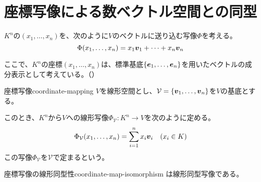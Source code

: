 \documentclass[../../../topic_linear-algebra]{subfiles}
\begin{document}
\sectionline
\section{座標写像による数ベクトル空間との同型}

$K^n$の$(x_1,\dots,x_n)$を、次のように$V$のベクトルに送り込む写像$\Phi$を考える。
\begin{equation*}
  \Phi(x_1,\dots,x_n) = x_1 \vb*{v}_1 + \cdots + x_n \vb*{v}_n
\end{equation*}

ここで、$K^n$の座標$(x_1,\dots,x_n)$は、標準基底$\{ \vb*{e}_1, \dots, \vb*{e}_n \}$を用いたベクトルの成分表示として考えている。（）

\begin{mindflow}
\end{mindflow}

\begin{definition}{座標写像}{coordinate-mapping}
  $V$を線形空間とし、$\mathcal{V} = \{ \vb*{v}_1, \dots, \vb*{v}_n \}$を$V$の基底とする。

  このとき、$K^n$から$V$への線形写像$\Phi_{\mathcal{V}}\colon K^n \to V$を次のように定める。
  \begin{equation*}
    \Phi_{\mathcal{V}}(x_1,\dots,x_n) = \sum_{i=1}^n x_i \vb*{v}_i \quad (x_i \in K)
  \end{equation*}
  この写像$\Phi_{\mathcal{V}}$を$\mathcal{V}$で定まるという。
\end{definition}

\begin{theorem}{座標写像の線形同型性}{coordinate-map-isomorphism}
  は線形同型写像である。
\end{theorem}
\end{document}
